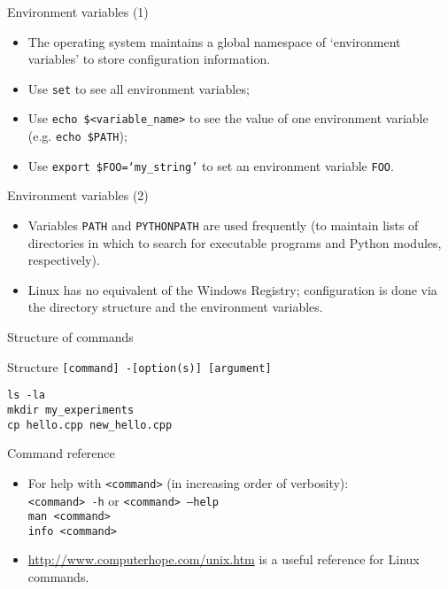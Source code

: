 \documentclass[dvipsnames]{beamer}
\newcommand{\command}[1]{\colorbox{light-gray}{\texttt{#1}}}
\begin{document}
\begin{frame}{Environment variables (1)}
  \begin{itemize}
    \item The operating system maintains a global namespace of `environment variables' to store configuration information.
    \item Use  \command{set} to see all environment variables;
    \item Use \command{echo \$<variable\_name>} to see the value of one environment variable (e.g. \command{echo \$PATH});
    \item Use \command{export \$FOO=`my\_string'} to set an environment variable \texttt{FOO}.
  \end{itemize}
\end{frame}


\begin{frame}{Environment variables (2)}
  \begin{itemize}
    \item Variables \texttt{PATH} and \texttt{PYTHONPATH} are used frequently (to maintain lists of directories in which to search for executable programs and Python modules, respectively).
    \item Linux has no equivalent of the Windows Registry; configuration is done via the directory structure and the environment variables.
  \end{itemize}
\end{frame}


\begin{frame}{Structure of commands}
  \begin{block}{Structure}
    \command{[command] -[option(s)] [argument]}
  \end{block}
  \begin{Examples}
     \command{ls -la} \\
     \command{mkdir my\_experiments} \\
     \command{cp hello.cpp new\_hello.cpp}
  \end{Examples}
\end{frame}


\begin{frame}{Command reference}
  \begin{itemize}
  \item For help with \command{<command>} (in increasing order of verbosity): \\ \command{<command> -h} or \command{<command> --help} \\ \command{man <command>} \\ \command{info <command>}
  \item \url{http://www.computerhope.com/unix.htm} is a useful reference for Linux commands.
\end{itemize}
\end{frame}
\end{document}
